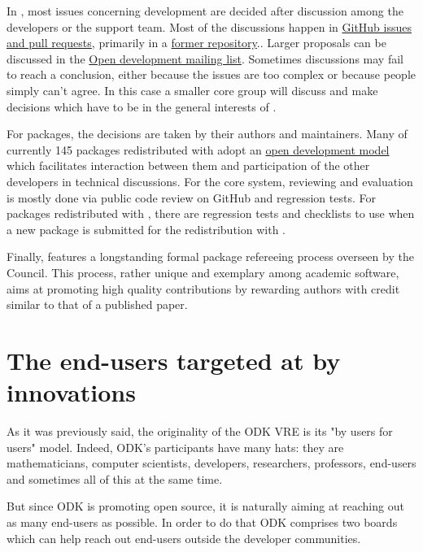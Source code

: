 \documentclass{deliverablereport}
\begin{document}
In \GAP, most issues concerning development are decided after
discussion among the developers or the support team. Most of the
discussions happen in \href{https://github.com/gap-system}{GitHub
  issues and pull requests}, primarily in a
\href{https://github.com/gap-system/gap}{former
  repository}.. Larger
proposals can be discussed in the
\href{http://mail.gap-system.org/mailman/listinfo/gap}{Open \GAP
  development mailing list}. Sometimes discussions may fail to reach a
conclusion, either because the issues are too complex or because
people simply can’t agree. In this case a smaller core group will
discuss and make decisions which have to be in the general interests
of \GAP.

For \GAP packages, the decisions are taken by their authors and
maintainers. Many of currently 145 packages redistributed with \GAP
adopt an \href{http://gap-packages.github.io/}{open development model}
which facilitates interaction between them and participation of the
other \GAP developers in technical discussions.  For the
core \GAP system, reviewing and evaluation is mostly done via public
code review on GitHub and regression tests. For \GAP packages
redistributed with \GAP, there are regression tests and checklists to
use when a new package is submitted for the redistribution with \GAP.

Finally, \GAP features a longstanding formal package refereeing process
overseen by the \GAP Council. This process, rather unique and exemplary
among academic software, aims at promoting high quality contributions
by rewarding authors with credit similar to that of a published paper.

\section{The end-users targeted at by innovations}


As it was previously said, the originality of the ODK VRE is its "by users for users" model. Indeed, ODK's participants have many hats: they are mathematicians, computer scientists, developers, researchers, professors, end-users and sometimes all of this at the same time.

But since ODK is promoting open source, it is naturally aiming at reaching out as many end-users as possible. In order to do that ODK comprises two boards which can help reach out end-users outside the developer communities.
\end{document}
